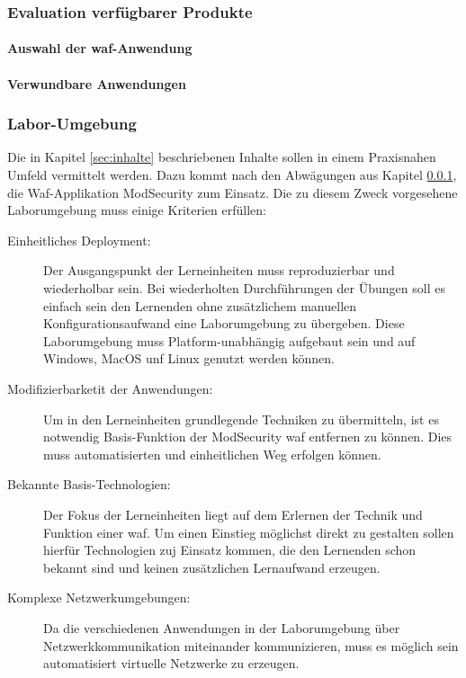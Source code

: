 \subsubsection{Evaluation verfügbarer Produkte}
\label{sec:produkt-eval}
\paragraph{Auswahl der \ac{waf}-Anwendung}

\paragraph{Verwundbare Anwendungen}

\subsubsection{Labor-Umgebung}


Die in Kapitel \ref{sec:inhalte} beschriebenen Inhalte sollen in einem Praxisnahen Umfeld vermittelt werden.
Dazu kommt nach den Abwägungen aus Kapitel \ref{sec:produkt-eval}, die Waf-Applikation ModSecurity zum Einsatz.
Die zu diesem Zweck vorgesehene Laborumgebung muss einige Kriterien erfüllen:
\begin{description}
    \item[Einheitliches Deployment:] Der Ausgangspunkt der Lerneinheiten muss reproduzierbar und wiederholbar sein. 
    Bei wiederholten Durchführungen der Übungen soll es einfach sein den Lernenden ohne zusätzlichem manuellen Konfigurationsaufwand eine Laborumgebung zu übergeben. 
    Diese Laborumgebung muss Platform-unabhängig aufgebaut sein und auf Windows, MacOS unf Linux genutzt werden können.
    \item[Modifizierbarketit der Anwendungen:] Um in den Lerneinheiten grundlegende Techniken zu übermitteln, ist es notwendig Basis-Funktion der ModSecurity \ac{waf} entfernen zu können. 
    Dies muss automatisierten und einheitlichen Weg erfolgen können.
    \item[Bekannte Basis-Technologien:] Der Fokus der Lerneinheiten liegt auf dem Erlernen der Technik und Funktion einer \ac{waf}. 
    Um einen Einstieg möglichst direkt zu gestalten sollen hierfür Technologien zuj Einsatz kommen, die den Lernenden schon bekannt sind und keinen zusätzlichen Lernaufwand erzeugen.
    \item[Komplexe Netzwerkumgebungen:] Da die verschiedenen Anwendungen in der Laborumgebung über Netzwerkkommunikation miteinander kommunizieren, muss es möglich sein automatisiert virtuelle Netzwerke zu erzeugen.
\end{description}

